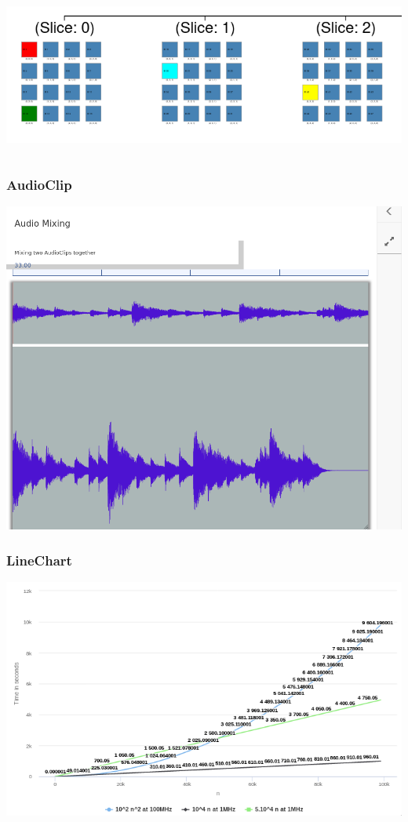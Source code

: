 \documentclass[aspectratio=169]{beamer}
\begin{document}
\begin{frame}
\begin{columns}
    \includegraphics[width=1.0\linewidth]{viz_figs/Array3Dout.png}
  \end{columns}
\end{frame}


\begin{frame}
  \frametitle{AudioClip}

  \includegraphics[width=.7\linewidth]{viz_figs/AudioClip1.png}
\end{frame}


\begin{frame}
  \frametitle{LineChart}
  
  \includegraphics[width=.7\linewidth]{viz_figs/LineChart.png}
\end{frame}
\end{document}
